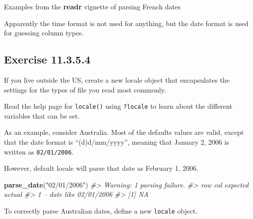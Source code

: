 \documentclass[]{book}
\newenvironment{Shaded}{\begin{snugshade}}{\end{snugshade}}
\newcommand{\CommentTok}[1]{\textcolor[rgb]{0.56,0.35,0.01}{\textit{#1}}}
\newcommand{\DataTypeTok}[1]{\textcolor[rgb]{0.13,0.29,0.53}{#1}}
\newcommand{\KeywordTok}[1]{\textcolor[rgb]{0.13,0.29,0.53}{\textbf{#1}}}
\newcommand{\NormalTok}[1]{#1}
\newcommand{\StringTok}[1]{\textcolor[rgb]{0.31,0.60,0.02}{#1}}
\theoremstyle{plain}
\theoremstyle{remark}
\begin{document}
Examples from the \textbf{readr} vignette of parsing French dates

\begin{Shaded}
\end{Shaded}

Apparently the time format is not used for anything, but the date format is used for guessing column types.

\hypertarget{exercise-11.3.5.4}{%
\subsection*{\texorpdfstring{Exercise {11.3.5.4}}{Exercise 11.3.5.4}}\label{exercise-11.3.5.4}}

If you live outside the US, create a new locale object that encapsulates the settings for the types of file you read most commonly.

Read the help page for \texttt{locale()} using \texttt{?locale} to learn about the different variables that can be set.

As an example, consider Australia.
Most of the defaults values are valid, except that the date format is ``(d)d/mm/yyyy'', meaning that January 2, 2006 is written as \texttt{02/01/2006}.

However, default locale will parse that date as February 1, 2006.

\begin{Shaded}
\begin{Highlighting}[]
\KeywordTok{parse_date}\NormalTok{(}\StringTok{"02/01/2006"}\NormalTok{)}
\CommentTok{#> Warning: 1 parsing failure.}
\CommentTok{#> row col   expected     actual}
\CommentTok{#>   1  -- date like  02/01/2006}
\CommentTok{#> [1] NA}
\end{Highlighting}
\end{Shaded}

To correctly parse Australian dates, define a new \texttt{locale} object.
\end{document}
